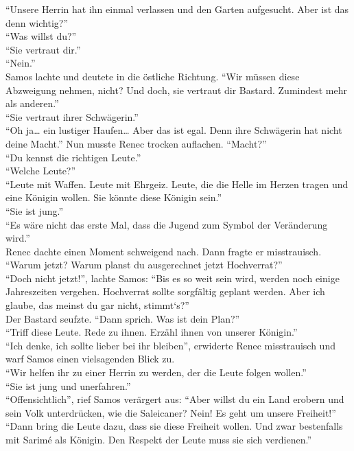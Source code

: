 ``Unsere Herrin hat ihn einmal verlassen und den Garten aufgesucht. Aber ist das denn wichtig?''\\
``Was willst du?''\\
``Sie vertraut dir.''\\
``Nein.''\\
Samos lachte und deutete in die östliche Richtung. ``Wir müssen diese Abzweigung nehmen, nicht? Und 
doch, sie vertraut dir Bastard. Zumindest mehr als anderen.''\\
``Sie vertraut ihrer Schwägerin.''\\
``Oh ja… ein lustiger Haufen… Aber das ist egal. Denn ihre Schwägerin hat nicht deine Macht.''
Nun musste Renec trocken auflachen. ``Macht?''\\
``Du kennst die richtigen Leute.''\\
``Welche Leute?''\\
``Leute mit Waffen. Leute mit Ehrgeiz. Leute, die die Helle im Herzen tragen und eine Königin 
wollen. 
Sie könnte diese Königin sein.''\\
``Sie ist jung.''\\
``Es wäre nicht das erste Mal, dass die Jugend zum Symbol der Veränderung wird.''\\
Renec dachte einen Moment schweigend nach. Dann fragte er misstrauisch. ``Warum jetzt? Warum planst 
du ausgerechnet jetzt Hochverrat?''\\
``Doch nicht jetzt!'', lachte Samos: ``Bis es so weit sein wird, werden noch einige Jahreszeiten 
vergehen. Hochverrat sollte sorgfältig geplant werden. Aber ich glaube, das meinst du gar nicht, 
stimmt‘s?''\\
Der Bastard seufzte. ``Dann sprich. Was ist dein Plan?''\\
``Triff diese Leute. Rede zu ihnen. Erzähl ihnen von unserer Königin.''\\
``Ich denke, ich sollte lieber bei ihr bleiben'', erwiderte Renec misstrauisch und warf Samos einen 
vielsagenden Blick zu.\\
``Wir helfen ihr zu einer Herrin zu werden, der die Leute folgen wollen.''\\
``Sie ist jung und unerfahren.''\\
``Offensichtlich'', rief Samos verärgert aus: ``Aber willst du ein Land erobern und sein Volk 
unterdrücken, wie die Saleicaner? Nein! Es geht um unsere Freiheit!''\\
``Dann bring die Leute dazu, dass sie diese Freiheit wollen. Und zwar bestenfalls mit Sarimé als 
Königin. Den Respekt der Leute muss sie sich verdienen.''\\

